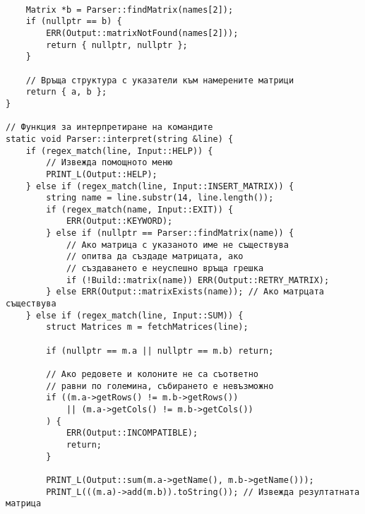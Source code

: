 \documentclass[oneside]{book}
\begin{document}
\begin{mdframed}\begin{lstlisting}[firstnumber=last]

	Matrix *b = Parser::findMatrix(names[2]);
	if (nullptr == b) {
		ERR(Output::matrixNotFound(names[2]));
		return { nullptr, nullptr };
	}

	// Връща структура с указатели към намерените матрици
	return { a, b };
}

// Функция за интерпретиране на командите
static void Parser::interpret(string &line) {
	if (regex_match(line, Input::HELP)) {
		// Извежда помощното меню
		PRINT_L(Output::HELP);
	} else if (regex_match(line, Input::INSERT_MATRIX)) {
		string name = line.substr(14, line.length());
		if (regex_match(name, Input::EXIT)) {
			ERR(Output::KEYWORD);
		} else if (nullptr == Parser::findMatrix(name)) {
			// Ако матрица с указаното име не съществува
			// опитва да създаде матрицата, ако
			// създаването е неуспешно връща грешка
			if (!Build::matrix(name)) ERR(Output::RETRY_MATRIX);
		} else ERR(Output::matrixExists(name)); // Ако матрцата съществува
	} else if (regex_match(line, Input::SUM)) {
		struct Matrices m = fetchMatrices(line);

		if (nullptr == m.a || nullptr == m.b) return;

		// Ако редовете и колоните не са съответно
		// равни по големина, събирането е невъзможно
		if ((m.a->getRows() != m.b->getRows()) 
			|| (m.a->getCols() != m.b->getCols())
		) {
			ERR(Output::INCOMPATIBLE);
			return;
		}

		PRINT_L(Output::sum(m.a->getName(), m.b->getName()));
		PRINT_L(((m.a)->add(m.b)).toString()); // Извежда резултатната матрица
\end{lstlisting}\end{mdframed}
\pagebreak
\end{document}
